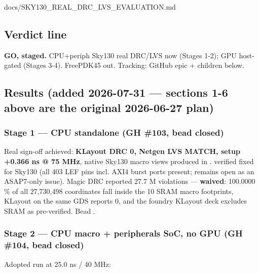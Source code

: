 \begin{relocated}{docs/SKY130_REAL_DRC_LVS_EVALUATION.md}
\subsection{Verdict line}\label{tm:pd:sky130-real-drc-lvs:6-verdict-line}

\textbf{GO, staged.} CPU+periph Sky130 real DRC/LVS now (Stages 1-2);
GPU host-gated (Stages 3-4). FreePDK45 out. Tracking: GitHub epic +
children below.

\subsection{Results (added 2026-07-31 --- sections 1-6 above are the
original 2026-06-27 plan)}\label{tm:pd:sky130-real-drc-lvs:7-results-added-2026-07-31-sections-1-6-above-are-the-original-2026-06-27-plan}

\subsubsection{Stage 1 --- CPU standalone (GH \#103, bead closed)}\label{tm:pd:sky130-real-drc-lvs:stage-1-cpu-standalone-gh-103-bead-closed}

Real sign-off achieved: \textbf{KLayout DRC 0, Netgen LVS MATCH, setup
+0.366 ns @ 75 MHz}, native Sky130 macro views produced in
.  verified fixed for Sky130 (all
403 LEF pins incl. AXI4 burst ports present;  remains open as
an ASAP7-only issue). Magic DRC reported 27.7 M violations ---
\textbf{waived}: 100.0000 \% of all 27,730,498 coordinates fall inside
the 10 SRAM macro footprints, KLayout on the same GDS reports 0, and the
foundry KLayout deck excludes SRAM as pre-verified. Bead .

\subsubsection{\texorpdfstring{Stage 2 --- CPU macro + peripherals SoC,
no GPU (GH \#104, bead 
closed)}{Stage 2 --- CPU macro + peripherals SoC, no GPU (GH \#104, bead  closed)}}\label{tm:pd:sky130-real-drc-lvs:stage-2-cpu-macro-peripherals-soc-no-gpu-gh-104-bead-9t6-closed}

Adopted run  at 25.0 ns / 40 MHz:


\end{relocated}
